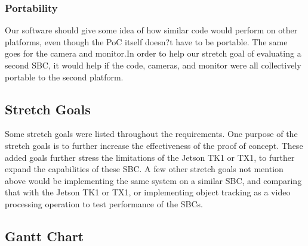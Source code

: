 \subsubsection{Portability}
Our software should give some idea of how similar code would perform on other platforms, even though the PoC itself doesn?t have to be portable. The same goes for the camera and monitor.In order to help our stretch goal of evaluating a second SBC, it would help if the code, cameras, and monitor were all collectively portable to the second platform.\\

\subsection{Stretch Goals}
Some stretch goals were listed throughout the requirements. One purpose of the stretch goals is to further increase the effectiveness of the proof of concept. These added goals further stress the limitations of the Jetson TK1 or TX1, to further expand the capabilities of these SBC. A few other stretch goals not mention above would be implementing the same system on a similar SBC, and comparing that with the Jetson TK1 or TX1, or implementing object tracking as a video processing operation to test performance of the SBCs.\\

\subsection{Gantt Chart}
